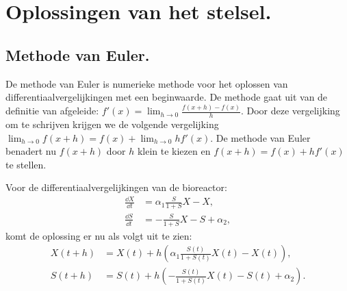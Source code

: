 
\chapter{Oplossingen van het stelsel.}
\label{Oplossingen van het stelsel}

\section{Methode van Euler.}
De methode van Euler is numerieke methode voor het oplossen van differentiaalvergelijkingen met een beginwaarde. De methode gaat uit van de definitie van afgeleide: $f'(x) = \lim_{h\to0}\frac{f(x+h)-f(x)}{h}$. Door deze vergelijking om te schrijven krijgen we de volgende vergelijking $\lim_{h\to0}f(x+h) = f(x) + \lim_{h\to0}hf'(x)$. De methode van Euler benadert nu $f(x+h)$ door $h$ klein te kiezen en $f(x+h) = f(x) + hf'(x)$ te stellen.

Voor de differentiaalvergelijkingen van de bioreactor:
\begin{align*}
	\frac{\dd X}{\dd t} &= \alpha_1 \frac{S}{1 + S} X - X,\\
	\frac{\dd S}{\dd t} &= - \frac{S}{1 + S}X - S + \alpha_2,
\end{align*}
komt de oplossing er nu als volgt uit te zien:
\begin{align*}
	X(t+h) &= X(t) + h(\alpha_1 \frac{S(t)}{1 + S(t)} X(t) - X(t)),\\
	S(t+h) &= S(t) + h(- \frac{S(t)}{1 + S(t)}X(t) - S(t) + \alpha_2).
\end{align*}

